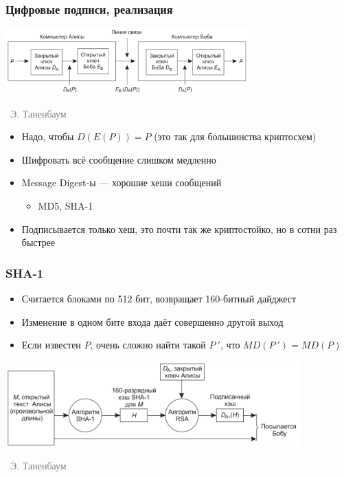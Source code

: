 \documentclass[xetex,mathserif,serif]{beamer}
\newcommand{\attribution}[1] {
\vspace{-5mm}\begin{flushright}\begin{scriptsize}\textcolor{gray}{\textcopyright\, #1}\end{scriptsize}\end{flushright}
}
\begin{document}
    \begin{frame}
        \frametitle{Цифровые подписи, реализация}
        \begin{center}
            \includegraphics[width=0.7\textwidth]{signature.png}
            \attribution{Э. Таненбаум}
        \end{center}
        \begin{itemize}
            \item Надо, чтобы $D(E(P)) = P$ (это так для большинства криптосхем)
            \item Шифровать всё сообщение слишком медленно
            \item Message Digest-ы --- хорошие хеши сообщений
            \begin{itemize}
                \item MD5, SHA-1
            \end{itemize}
            \item Подписывается только хеш, это почти так же криптостойко, но в сотни раз быстрее
        \end{itemize}
    \end{frame}

    \begin{frame}
        \frametitle{SHA-1}
        \begin{itemize}
            \item Считается блоками по 512 бит, возвращает 160-битный дайджест
            \item Изменение в одном бите входа даёт совершенно другой выход
            \item Если известен $P$, очень сложно найти такой $P\ '$, что $MD(P\ ') = MD(P)$
        \end{itemize}
        \begin{center}
            \includegraphics[width=0.85\textwidth]{sha1Signature.png}
            \attribution{Э. Таненбаум}
        \end{center}
    \end{frame}
\end{document}
